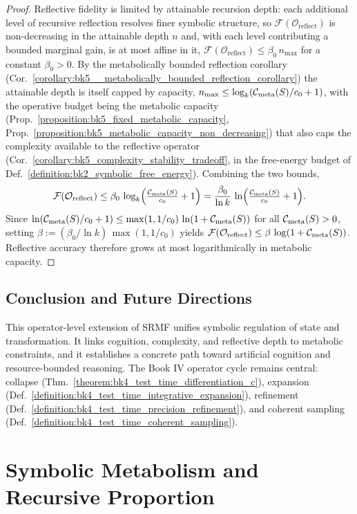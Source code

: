 \begin{proof}
\label{proof:bk5_metabolic_constraints_reflective_accuracy}
\leavevmode
Reflective fidelity is limited by attainable recursion depth: each additional level of recursive reflection resolves finer symbolic structure, so $\mathcal{F}(\mathcal{O}_{\text{reflect}})$ is non-decreasing in the attainable depth $n$ and, with each level contributing a bounded marginal gain, is at most affine in it, $\mathcal{F}(\mathcal{O}_{\text{reflect}})\le \beta_0\,n_{\max}$ for a constant $\beta_0>0$. By the metabolically bounded reflection corollary (Cor.~\ref{corollary:bk5__metabolically_bounded_reflection_corollary}) the attainable depth is itself capped by capacity, $n_{\max}\le\log_k(\mathcal{C}_{\text{meta}}(S)/c_0+1)$, with the operative budget being the metabolic capacity (Prop.~\ref{proposition:bk5_fixed_metabolic_capacity}, Prop.~\ref{proposition:bk5_metabolic_capacity_non_decreasing}) that also caps the complexity available to the reflective operator (Cor.~\ref{corollary:bk5_complexity_stability_tradeoff}, in the free-energy budget of Def.~\ref{definition:bk2_symbolic_free_energy}). Combining the two bounds,
\[
\mathcal{F}(\mathcal{O}_{\text{reflect}})\le\beta_0\,\log_k\!\Big(\tfrac{\mathcal{C}_{\text{meta}}(S)}{c_0}+1\Big)=\frac{\beta_0}{\ln k}\,\ln\!\Big(\tfrac{\mathcal{C}_{\text{meta}}(S)}{c_0}+1\Big).
\]
Since $\ln(\mathcal{C}_{\text{meta}}(S)/c_0+1)\le \max(1,1/c_0)\,\ln(1+\mathcal{C}_{\text{meta}}(S))$ for all $\mathcal{C}_{\text{meta}}(S)>0$, setting $\beta:=(\beta_0/\ln k)\,\max(1,1/c_0)$ yields $\mathcal{F}(\mathcal{O}_{\text{reflect}})\le\beta\,\log(1+\mathcal{C}_{\text{meta}}(S))$. Reflective accuracy therefore grows at most logarithmically in metabolic capacity.
\end{proof}
\subsection{Conclusion and Future Directions}
\label{subsec:bk5_conclustion_and_future_directions}
This operator-level extension of SRMF unifies symbolic regulation of state and transformation. It links cognition, complexity, and reflective depth to metabolic constraints, and it establishes a concrete path toward artificial cognition and resource-bounded reasoning.
The Book IV operator cycle remains central: collapse (Thm.~\ref{theorem:bk4_test_time_differentiation_c}), expansion (Def.~\ref{definition:bk4_test_time_integrative_expansion}), refinement (Def.~\ref{definition:bk4_test_time_precision_refinement}), and coherent sampling (Def.~\ref{definition:bk4_test_time_coherent_sampling}).

\section{Symbolic Metabolism and Recursive Proportion}
\label{sec:bk5_golden_ratio}

